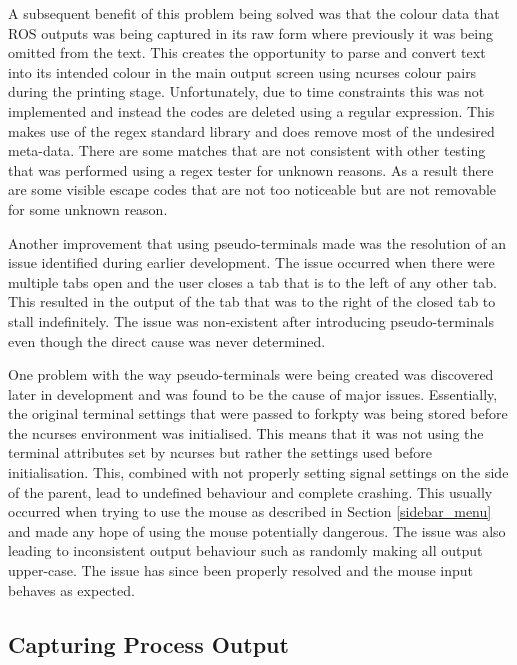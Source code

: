 A subsequent benefit of this problem being solved was that the colour data that {\selectfont ROS} outputs was being captured in its raw form where previously it was being omitted from the text. This creates the opportunity to parse and convert text into its intended colour in the main output screen using {\selectfont ncurses} colour pairs during the printing stage. Unfortunately, due to time constraints this was not implemented and instead the codes are deleted using a regular expression. This makes use of the {\selectfont regex}\cite{cpp-regex} standard library and does remove most of the undesired meta-data. There are some matches that are not consistent with other testing that was performed using a {\selectfont regex} tester\cite{regex-tester} for unknown reasons. As a result there are some visible escape codes that are not too noticeable but are not removable for some unknown reason.

Another improvement that using pseudo-terminals made was the resolution of an issue identified during earlier development. The issue occurred when there were multiple tabs open and the user closes a tab that is to the left of any other tab. This resulted in the output of the tab that was to the right of the closed tab to stall indefinitely. The issue was non-existent after introducing pseudo-terminals even though the direct cause was never determined.

One problem with the way pseudo-terminals were being created was discovered later in development and was found to be the cause of major issues. Essentially, the original terminal settings that were passed to {\selectfont forkpty} was being stored before the {\selectfont ncurses} environment was initialised. This means that it was not using the terminal attributes set by {\selectfont ncurses} but rather the settings used before initialisation. This, combined with not properly setting signal settings on the side of the parent, lead to undefined behaviour and complete crashing. This usually occurred when trying to use the mouse as described in Section \ref{sidebar_menu} and made any hope of using the mouse potentially dangerous. The issue was also leading to inconsistent output behaviour such as randomly making all output upper-case. The issue has since been properly resolved and the mouse input behaves as expected.

\subsection{Capturing Process Output}
\label{capturing_output}

